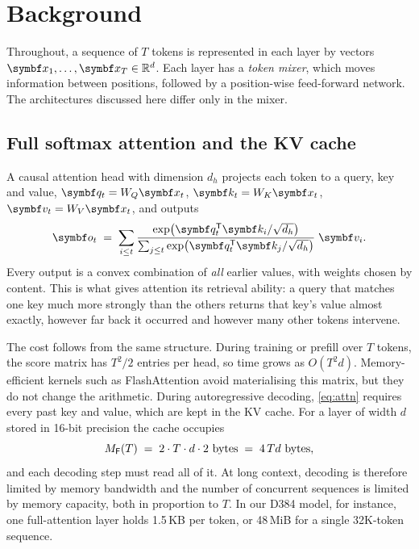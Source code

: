 \documentclass[10pt,a4paper]{article}
\begin{document}
\section{Background}\label{sec:background}

Throughout, a sequence of $T$ tokens is represented in each layer by vectors
$\vect{x}_1,\dots,\vect{x}_T\in\R^{d}$. Each layer has a \emph{token mixer}, which moves information
between positions, followed by a position-wise feed-forward network. The architectures discussed
here differ only in the mixer.

\subsection{Full softmax attention and the KV cache}
A causal attention head with dimension $d_h$ projects each token to a query, key and value,
$\vect{q}_t=W_Q\vect{x}_t$, $\vect{k}_t=W_K\vect{x}_t$, $\vect{v}_t=W_V\vect{x}_t$, and outputs
\begin{equation}\label{eq:attn}
  \vect{o}_t \;=\; \sum_{i\le t}
  \frac{\exp\!\big(\vect{q}_t^{\T}\vect{k}_i/\sqrt{d_h}\big)}
       {\sum_{j\le t}\exp\!\big(\vect{q}_t^{\T}\vect{k}_j/\sqrt{d_h}\big)}\;\vect{v}_i .
\end{equation}
Every output is a convex combination of \emph{all} earlier values, with weights chosen by
content. This is what gives attention its retrieval ability: a query that matches one key much more
strongly than the others returns that key's value almost exactly, however far back it occurred and
however many other tokens intervene.

The cost follows from the same structure. During training or prefill over $T$ tokens, the score
matrix has $T^2/2$ entries per head, so time grows as $O(T^2 d)$. Memory-efficient kernels such as
FlashAttention \citep{dao2022flashattention,dao2023flashattention2} avoid materialising this matrix,
but they do not change the arithmetic. During autoregressive decoding, \cref{eq:attn} requires every
past key and value, which are kept in the KV cache. For a layer of width $d$ stored in 16-bit
precision the cache occupies
\begin{equation}\label{eq:kv}
  M_{\Full}(T) \;=\; 2\cdot T\cdot d\cdot 2\ \text{bytes} \;=\; 4\,T d\ \text{bytes},
\end{equation}
and each decoding step must read all of it. At long context, decoding is therefore limited by memory
bandwidth and the number of concurrent sequences is limited by memory capacity, both in proportion
to $T$. In our D384 model, for instance, one full-attention layer holds 1.5\,KB per token, or 48\,MiB
for a single 32K-token sequence.
\end{document}
